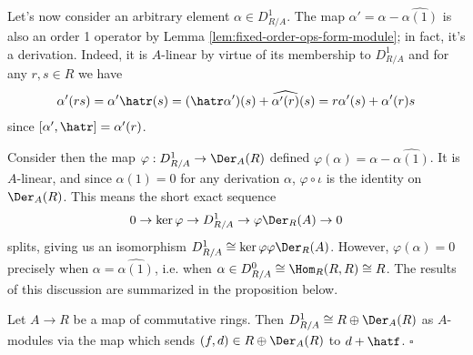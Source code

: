 Let's now consider an arbitrary element $\alpha \in D^1_{R/A}$. The map $\alpha' = \alpha - \widehat{\alpha(1)}$ is also an order 1 operator by Lemma \ref{lem:fixed-order-ops-form-module}; in fact, it's a derivation. Indeed, it is $A$-linear by virtue of its membership to $D^1_{R/A}$ and for any $r,s\in R$ we have
\begin{align*}
	\alpha'(rs) = \alpha'\hatr(s) = (\hatr \alpha')(s) + \widehat{\alpha'(r)}(s) = r\alpha'(s) + \alpha'(r)s
\end{align*}
since $[\alpha',\hatr] = \alpha'(r)$. 

Consider then the map $\varphi:D^1_{R/A}\to \Der_A(R)$ defined $\varphi(\alpha) = \alpha - \widehat{\alpha(1)}$. It is $A$-linear, and since $\alpha(1) = 0$ for any derivation $\alpha$, $\varphi\circ \iota$ is the identity on $\Der_A(R)$. This means the short exact sequence
\begin{align*}
	0 \to \ker \varphi \to D^1_{R/A} \to{\varphi} \Der_R(A) \to 0
\end{align*}
splits, giving us an isomorphism $D^1_{R/A} \cong \ker \varphi\varphi \Der_R(A)$. However, $\varphi(\alpha) = 0$ precisely when $\alpha = \widehat{\alpha(1)}$, i.e. when $\alpha \in D^0_{R/A} \cong \Hom_R(R,R) \cong R$. The results of this discussion are summarized in the proposition below.

\begin{prop}\label{prop:order-one-operators}
	Let $A\to R$ be a map of commutative rings. Then $D^1_{R/A}\cong R\oplus \Der_A(R)$ as $A$-modules via the map which sends $(f,d) \in R\oplus \Der_A(R)$ to $d + \hatf$. \hfill $\square$
\end{prop}

